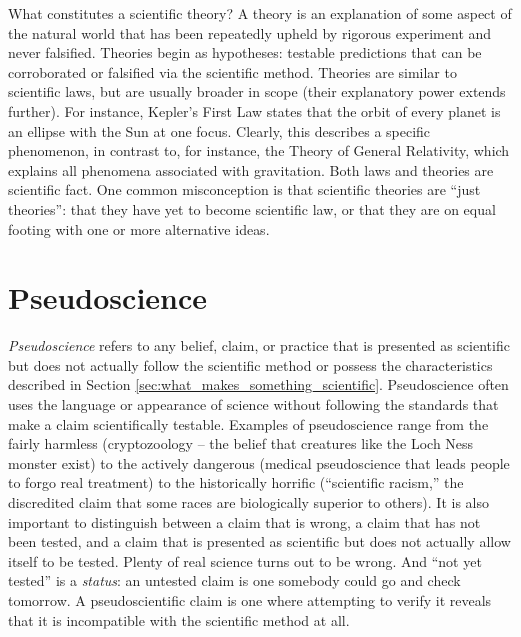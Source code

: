 \documentclass[11pt]{article}
\begin{document}
What constitutes a scientific theory? A theory is an explanation of some aspect of the natural world that has been repeatedly upheld by rigorous experiment and never falsified. Theories begin as hypotheses: testable predictions that can be corroborated or falsified via the scientific method. Theories are similar to scientific laws, but are usually broader in scope (their explanatory power extends further). For instance, Kepler's First Law states that the orbit of every planet is an ellipse with the Sun at one focus. Clearly, this describes a specific phenomenon, in contrast to, for instance, the Theory of General Relativity, which explains all phenomena associated with gravitation. Both laws and theories are scientific fact. One common misconception is that scientific theories are ``just theories'': that they have yet to become scientific law, or that they are on equal footing with one or more alternative ideas.


\section{Pseudoscience}
\textit{Pseudoscience} refers to any belief, claim, or practice that is
presented as scientific but does not actually follow the scientific method
or possess the characteristics described in Section \ref{sec:what_makes_something_scientific}. Pseudoscience often uses the language or
appearance of science without following the standards that make a claim
scientifically testable. Examples of pseudoscience range from the fairly harmless
(cryptozoology -- the belief that creatures like the Loch Ness monster
exist) to the actively dangerous (medical pseudoscience that leads people to
forgo real treatment) to the historically horrific (``scientific racism,''
the discredited claim that some races are biologically superior to others).
It is also important to distinguish between a claim that is wrong, a claim that has not been tested, and a claim that is presented as scientific but does not actually allow itself to be tested. Plenty of real science turns out to be wrong. And ``not yet tested'' is
a \emph{status}: an untested claim is one somebody
could go and check tomorrow. A pseudoscientific claim is one where attempting to verify it reveals that it is incompatible with the scientific method at all.

\end{document}
